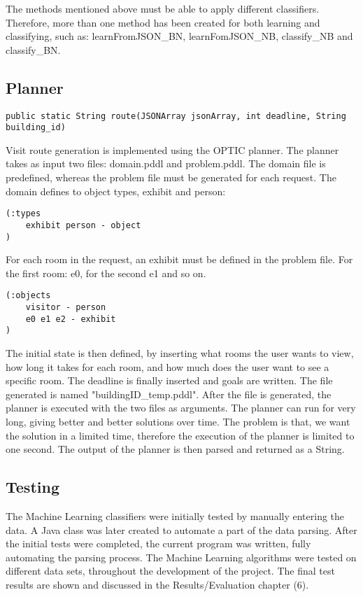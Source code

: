 \noindent
The methods mentioned above must be able to apply different classifiers. Therefore, more than one method has been created for both learning and classifying, such as: learnFromJSON\_BN, learnFomJSON\_NB, classify\_NB and classify\_BN. 

\subsection{Planner}
\begin{lstlisting}
public static String route(JSONArray jsonArray, int deadline, String building_id)
\end{lstlisting}
Visit route generation is implemented using the OPTIC planner. The planner takes as input two files: domain.pddl and problem.pddl. The domain file is predefined, whereas the problem file must be generated for each request. 
The domain defines to object types, exhibit and person: 
\begin{lstlisting}
(:types
    exhibit person - object
)
\end{lstlisting}
For each room in the request, an exhibit must be defined in the problem file. For the first room: e0, for the second e1 and so on.
\begin{lstlisting}
(:objects
    visitor - person
    e0 e1 e2 - exhibit
)
\end{lstlisting}
The initial state is then defined, by inserting what rooms the user wants to view, how long it takes for each room, and how much does the user want to see a specific room. The deadline is finally inserted and goals are written. The file generated is named "buildingID\_temp.pddl". 
After the file is generated, the planner is executed with the two files as arguments. The planner can run for very long, giving better and better solutions over time. The problem is that, we want the solution in a limited time, therefore the execution of the planner is limited to one second. The output of the planner is then parsed and returned as a String. 

\subsection{Testing}

The Machine Learning classifiers were initially tested by manually entering the data. A Java class was later created to automate a part of the data parsing. After the initial tests were completed, the current program was written, fully automating the parsing process. The Machine Learning algorithms were tested on different data sets, throughout the development of the project. The final test results are shown and discussed in the Results/Evaluation chapter (6). 

